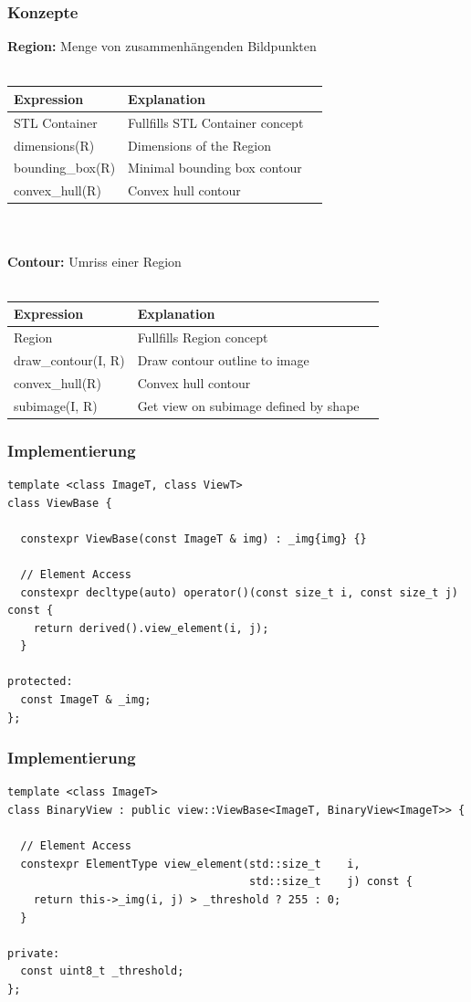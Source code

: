 \documentclass{beamer}
\begin{document}
\begin{frame}
  \frametitle{Konzepte}
  \textbf{Region:} Menge von zusammenhängenden Bildpunkten \\~\\
  \begin{tabular}{l | l | l}
    Expression  &  Explanation \\
    \hline
    STL Container & Fullfills STL Container concept \\
    \hline
    dimensions(R)   & Dimensions of the Region \\
    bounding\_box(R) & Minimal bounding box contour \\
    convex\_hull(R) & Convex hull contour \\
  \end{tabular}
  \\~\\
  \textbf{Contour:} Umriss einer Region \\~\\
  \begin{tabular}{l | l | l}
    Expression  &  Explanation \\
    \hline
    Region & Fullfills Region concept \\
    \hline
    draw\_contour(I, R) & Draw contour outline to image \\
    convex\_hull(R)  & Convex hull contour \\
    subimage(I, R)   & Get view on subimage defined by shape
  \end{tabular}
  \hline
\end{frame}

\begin{frame}[fragile]
\frametitle{Implementierung}
\begin{lstlisting}[caption=Basis Klasse zur Konstruktion von Views]
template <class ImageT, class ViewT>
class ViewBase {

  constexpr ViewBase(const ImageT & img) : _img{img} {}

  // Element Access
  constexpr decltype(auto) operator()(const size_t i, const size_t j) const {
    return derived().view_element(i, j);
  }

protected:
  const ImageT & _img;
};
\end{lstlisting}
\end{frame}
  
\begin{frame}[fragile]
\frametitle{Implementierung}
\begin{lstlisting}[caption=BinaryView mittels ``Thresholding'']
template <class ImageT>
class BinaryView : public view::ViewBase<ImageT, BinaryView<ImageT>> {

  // Element Access
  constexpr ElementType view_element(std::size_t    i,
                                     std::size_t    j) const {
    return this->_img(i, j) > _threshold ? 255 : 0;
  }

private:
  const uint8_t _threshold;
};
\end{lstlisting}

\end{frame}
\end{document}
